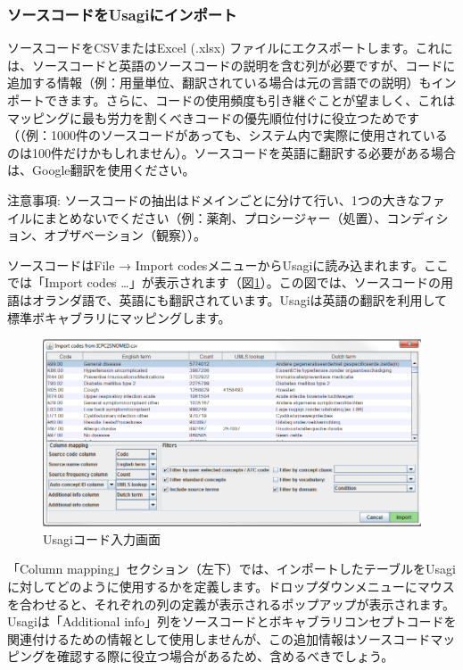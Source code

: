 \documentclass[
  11pt]{book}
\theoremstyle{definition}
\theoremstyle{definition}
\theoremstyle{definition}
\theoremstyle{definition}
\theoremstyle{remark}
\begin{document}
\subsubsection*{ソースコードをUsagiにインポート}\label{ux30bdux30fcux30b9ux30b3ux30fcux30c9ux3092usagiux306bux30a4ux30f3ux30ddux30fcux30c8}

ソースコードをCSVまたはExcel (.xlsx) ファイルにエクスポートします。これには、ソースコードと英語のソースコードの説明を含む列が必要ですが、コードに追加する情報（例：用量単位、翻訳されている場合は元の言語での説明）もインポートできます。さらに、コードの使用頻度も引き継ぐことが望ましく、これはマッピングに最も労力を割くべきコードの優先順位付けに役立つためです（（例：1000件のソースコードがあっても、システム内で実際に使用されているのは100件だけかもしれません）。ソースコードを英語に翻訳する必要がある場合は、Google翻訳を使用ください。

注意事項: ソースコードの抽出はドメインごとに分けて行い、1つの大きなファイルにまとめないでください（例：薬剤、プロシージャー（処置）、コンディション、オブザベーション（観察））。

ソースコードはFile → Import codesメニューからUsagiに読み込まれます。ここでは「Import codes \ldots」が表示されます（図\ref{fig:usagiImport}）。この図では、ソースコードの用語はオランダ語で、英語にも翻訳されています。Usagiは英語の翻訳を利用して標準ボキャブラリにマッピングします。

\begin{figure}

{\centering \includegraphics[width=1\linewidth]{images/ExtractTransformLoad/usagiImport} 

}

\caption{Usagiコード入力画面}\label{fig:usagiImport}
\end{figure}

「Column mapping」セクション（左下）では、インポートしたテーブルをUsagiに対してどのように使用するかを定義します。ドロップダウンメニューにマウスを合わせると、それぞれの列の定義が表示されるポップアップが表示されます。Usagiは「Additional info」列をソースコードとボキャブラリコンセプトコードを関連付けるための情報として使用しませんが、この追加情報はソースコードマッピングを確認する際に役立つ場合があるため、含めるべきでしょう。
\end{document}
